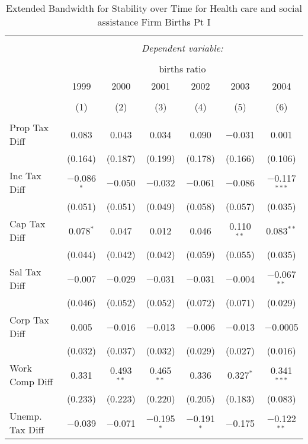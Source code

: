 
\begin{table}[!htbp] \centering 
  \caption{Extended Bandwidth for Stability over Time for  Health care and social assistance Firm Births Pt I} 
  \label{62year_eb} 
\small 
\begin{tabular}{@{\extracolsep{5pt}}lcccccc} 
\\[-1.8ex]\hline 
\hline \\[-1.8ex] 
 & \multicolumn{6}{c}{\textit{Dependent variable:}} \\ 
\cline{2-7} 
\\[-1.8ex] & \multicolumn{6}{c}{births ratio} \\ 
 & 1999 & 2000 & 2001 & 2002 & 2003 & 2004 \\ 
\\[-1.8ex] & (1) & (2) & (3) & (4) & (5) & (6)\\ 
\hline \\[-1.8ex] 
 Prop Tax Diff & 0.083 & 0.043 & 0.034 & 0.090 & $-$0.031 & 0.001 \\ 
  & (0.164) & (0.187) & (0.199) & (0.178) & (0.166) & (0.106) \\ 
  Inc Tax Diff & $-$0.086$^{*}$ & $-$0.050 & $-$0.032 & $-$0.061 & $-$0.086 & $-$0.117$^{***}$ \\ 
  & (0.051) & (0.051) & (0.049) & (0.058) & (0.057) & (0.035) \\ 
  Cap Tax Diff & 0.078$^{*}$ & 0.047 & 0.012 & 0.046 & 0.110$^{**}$ & 0.083$^{**}$ \\ 
  & (0.044) & (0.042) & (0.042) & (0.059) & (0.055) & (0.035) \\ 
  Sal Tax Diff & $-$0.007 & $-$0.029 & $-$0.031 & $-$0.031 & $-$0.004 & $-$0.067$^{**}$ \\ 
  & (0.046) & (0.052) & (0.052) & (0.072) & (0.071) & (0.029) \\ 
  Corp Tax Diff & 0.005 & $-$0.016 & $-$0.013 & $-$0.006 & $-$0.013 & $-$0.0005 \\ 
  & (0.032) & (0.037) & (0.032) & (0.029) & (0.027) & (0.016) \\ 
  Work Comp Diff & 0.331 & 0.493$^{**}$ & 0.465$^{**}$ & 0.336 & 0.327$^{*}$ & 0.341$^{***}$ \\ 
  & (0.233) & (0.223) & (0.220) & (0.205) & (0.183) & (0.083) \\ 
  Unemp. Tax Diff & $-$0.039 & $-$0.071 & $-$0.195$^{*}$ & $-$0.191$^{*}$ & $-$0.175 & $-$0.122$^{**}$ \\ 

\end{tabular}
\end{table}
